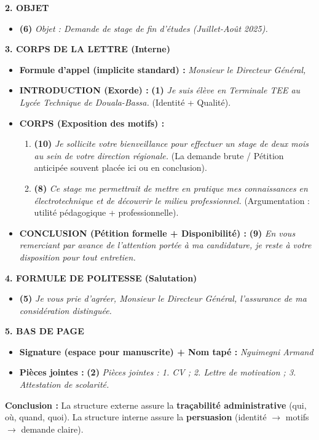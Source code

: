 \documentclass[11pt]{article}
\begin{document}
\begin{exoresolu}
\textbf{2. OBJET}
\begin{itemize}
    \item \textbf{(6)} \emph{Objet : Demande de stage de fin d'études (Juillet-Août 2025).}
\end{itemize}

\textbf{3. CORPS DE LA LETTRE (Interne)}
\begin{itemize}
    \item \textbf{Formule d'appel (implicite standard) :} \emph{Monsieur le Directeur Général,}
    \item \textbf{INTRODUCTION (Exorde) :} \textbf{(1)} \emph{Je suis élève en Terminale TEE au Lycée Technique de Douala-Bassa.} (Identité + Qualité).
    \item \textbf{CORPS (Exposition des motifs) :}
    \begin{enumerate}
        \item \textbf{(10)} \emph{Je sollicite votre bienveillance pour effectuer un stage de deux mois au sein de votre direction régionale.} (La demande brute / Pétition anticipée souvent placée ici ou en conclusion).
        \item \textbf{(8)} \emph{Ce stage me permettrait de mettre en pratique mes connaissances en électrotechnique et de découvrir le milieu professionnel.} (Argumentation : utilité pédagogique + professionnelle).
    \end{enumerate}
    \item \textbf{CONCLUSION (Pétition formelle + Disponibilité) :} \textbf{(9)} \emph{En vous remerciant par avance de l'attention portée à ma candidature, je reste à votre disposition pour tout entretien.}
\end{itemize}

\textbf{4. FORMULE DE POLITESSE (Salutation)}
\begin{itemize}
    \item \textbf{(5)} \emph{Je vous prie d'agréer, Monsieur le Directeur Général, l'assurance de ma considération distinguée.}
\end{itemize}

\textbf{5. BAS DE PAGE}
\begin{itemize}
    \item \textbf{Signature (espace pour manuscrite) + Nom tapé :} \emph{Nguimegni Armand}
    \item \textbf{Pièces jointes :} \textbf{(2)} \emph{Pièces jointes : 1. CV ; 2. Lettre de motivation ; 3. Attestation de scolarité.}
\end{itemize}

\textbf{Conclusion :} La structure externe assure la \textbf{traçabilité administrative} (qui, où, quand, quoi). La structure interne assure la \textbf{persuasion} (identité $\rightarrow$ motifs $\rightarrow$ demande claire).
\end{exoresolu}
\end{document}
